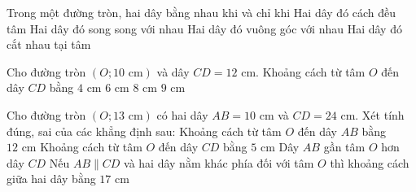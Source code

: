 
\begin{ex}%
	Trong một đường tròn, hai dây bằng nhau khi và chỉ khi
	\choice
	{\True Hai dây đó cách đều tâm}
	{Hai dây đó song song với nhau}
	{Hai dây đó vuông góc với nhau}
	{Hai dây đó cắt nhau tại tâm}
\end{ex}

\begin{ex}%
	Cho đường tròn $(O; 10\text{ cm})$ và dây $CD = 12\text{ cm}$. Khoảng cách từ tâm $O$ đến dây $CD$ bằng
	\choice
	{$4\text{ cm}$}
	{$6\text{ cm}$}
	{\True $8\text{ cm}$}
	{$9\text{ cm}$}
\end{ex}

\begin{ex}%
	Cho đường tròn $(O; 13\text{ cm})$ có hai dây $AB = 10\text{ cm}$ và $CD = 24\text{ cm}$. Xét tính đúng, sai của các khẳng định sau:
	\choiceTF
	{\True Khoảng cách từ tâm $O$ đến dây $AB$ bằng $12\text{ cm}$}
	{\True Khoảng cách từ tâm $O$ đến dây $CD$ bằng $5\text{ cm}$}
	{Dây $AB$ gần tâm $O$ hơn dây $CD$}
	{\True Nếu $AB \parallel CD$ và hai dây nằm khác phía đối với tâm $O$ thì khoảng cách giữa hai dây bằng $17\text{ cm}$}
\end{ex}

